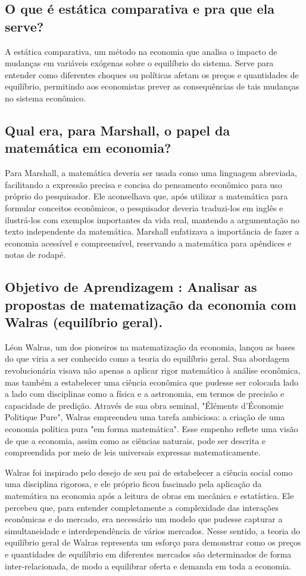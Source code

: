 \documentclass[12pt]{article}
\begin{document}
\subsection{\textbf{O que é estática comparativa e pra que ela serve?}}
A estática comparativa,  um método na economia que analisa o impacto de mudanças em variáveis exógenas sobre o equilíbrio do sistema. Serve para entender como diferentes choques ou políticas afetam os preços e quantidades de equilíbrio, permitindo aos economistas prever as consequências de tais mudanças no sistema econômico.
\subsection{\textbf{Qual era, para Marshall, o papel da matemática em economia?}}
Para Marshall, a matemática deveria ser usada como uma linguagem abreviada, facilitando a expressão precisa e concisa do pensamento econômico para uso próprio do pesquisador. Ele aconselhava que, após utilizar a matemática para formular conceitos econômicos, o pesquisador deveria traduzi-los em inglês e ilustrá-los com exemplos importantes da vida real, mantendo a argumentação no texto independente da matemática. Marshall enfatizava a importância de fazer a economia acessível e compreensível, reservando a matemática para apêndices e notas de rodapé.
\subsection{\textbf{Objetivo de Aprendizagem : Analisar as propostas de matematização da economia com Walras (equilíbrio geral).}}
Léon Walras, um dos pioneiros na matematização da economia, lançou as bases do que viria a ser conhecido como a teoria do equilíbrio geral. Sua abordagem revolucionária visava não apenas a aplicar rigor matemático à análise econômica, mas também a estabelecer uma ciência econômica que pudesse ser colocada lado a lado com disciplinas como a física e a astronomia, em termos de precisão e capacidade de predição. Através de sua obra seminal, "Éléments d'Économie Politique Pure", Walras empreendeu uma tarefa ambiciosa: a criação de uma economia política pura "em forma matemática". Esse empenho reflete uma visão de que a economia, assim como as ciências naturais, pode ser descrita e compreendida por meio de leis universais expressas matematicamente.

Walras foi inspirado pelo desejo de seu pai de estabelecer a ciência social como uma disciplina rigorosa, e ele próprio ficou fascinado pela aplicação da matemática na economia após a leitura de obras em mecânica e estatística. Ele percebeu que, para entender completamente a complexidade das interações econômicas e do mercado, era necessário um modelo que pudesse capturar a simultaneidade e interdependência de vários mercados. Nesse sentido, a teoria do equilíbrio geral de Walras representa um esforço para demonstrar como os preços e quantidades de equilíbrio em diferentes mercados são determinados de forma inter-relacionada, de modo a equilibrar oferta e demanda em toda a economia.
\end{document}
